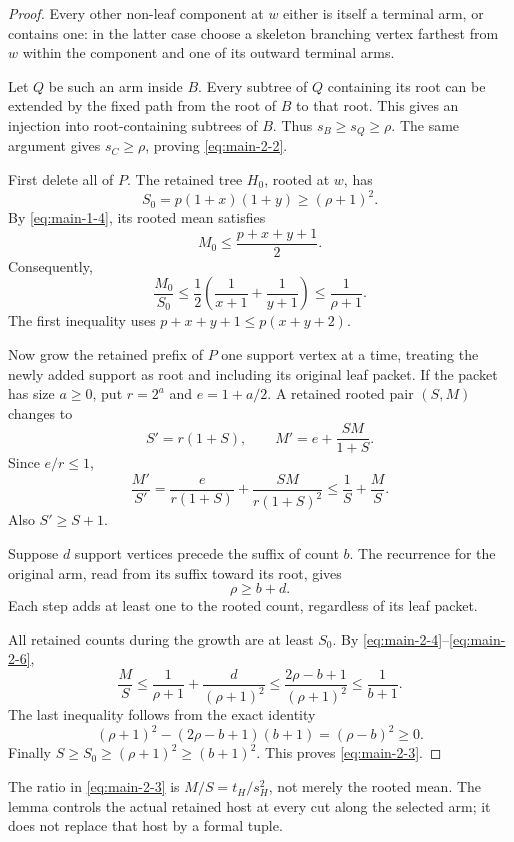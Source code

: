 \documentclass[11pt,reqno]{amsart}
\theoremstyle{plain}
\begin{document}
\begin{proof} Every other non-leaf component at \(w\) either is itself a terminal arm, or contains one: in the latter case choose a skeleton branching vertex farthest from \(w\) within the component and one of its outward terminal arms.

Let \(Q\) be such an arm inside \(B\). Every subtree of \(Q\) containing its root can be extended by the fixed path from the root of \(B\) to that root. This gives an injection into root-containing subtrees of \(B\). Thus \(s_B\ge s_Q\ge\rho\). The same argument gives \(s_C\ge\rho\), proving \eqref{eq:main-2-2}.

First delete all of \(P\). The retained tree \(H_0\), rooted at \(w\), has \[
S_0=p(1+x)(1+y)\ge(\rho+1)^2.
\] By \eqref{eq:main-1-4}, its rooted mean satisfies \[
M_0\le\frac{p+x+y+1}{2}.
\] Consequently, \[
\frac{M_0}{S_0}
\le\frac12\left(\frac1{x+1}+\frac1{y+1}\right)
\le\frac1{\rho+1}.
\tag{2.4}\label{eq:main-2-4}
\] The first inequality uses \(p+x+y+1\le p(x+y+2)\).

Now grow the retained prefix of \(P\) one support vertex at a time, treating the newly added support as root and including its original leaf packet. If the packet has size \(a\ge0\), put \(r=2^a\) and \(e=1+a/2\). A retained rooted pair \((S,M)\) changes to \[
S'=r(1+S),\qquad M'=e+\frac{SM}{1+S}.
\] Since \(e/r\le1\), \[
\frac{M'}{S'}
=\frac{e}{r(1+S)}+\frac{SM}{r(1+S)^2}
\le\frac1S+\frac MS.
\tag{2.5}\label{eq:main-2-5}
\] Also \(S'\ge S+1\).

Suppose \(d\) support vertices precede the suffix of count \(b\). The recurrence for the original arm, read from its suffix toward its root, gives \[
\rho\ge b+d.
\tag{2.6}\label{eq:main-2-6}
\] Each step adds at least one to the rooted count, regardless of its leaf packet.

All retained counts during the growth are at least \(S_0\). By \eqref{eq:main-2-4}--\eqref{eq:main-2-6}, \[
\frac MS
\le\frac1{\rho+1}+\frac d{(\rho+1)^2}
\le\frac{2\rho-b+1}{(\rho+1)^2}
\le\frac1{b+1}.
\] The last inequality follows from the exact identity \[
(\rho+1)^2-(2\rho-b+1)(b+1)=(\rho-b)^2\ge0.
\tag{2.7}\label{eq:main-2-7}
\] Finally \(S\ge S_0\ge(\rho+1)^2\ge(b+1)^2\). This proves \eqref{eq:main-2-3}. \end{proof}

The ratio in \eqref{eq:main-2-3} is \(M/S=t_H/s_H^2\), not merely the rooted mean. The lemma controls the actual retained host at every cut along the selected arm; it does not replace that host by a formal tuple.
\end{document}

